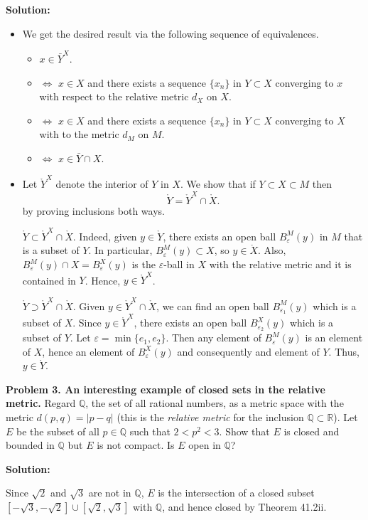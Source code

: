 \documentclass[12pt]{article}
\def\black{\color{black}}
\def\green{\color{rltgreen}}
\newcommand\bi{\begin{itemize}}
\newcommand\ei{\end{itemize}}
\newcommand\itema{\item[(a)]}
\newcommand\itemb{\item[(b)]}
\renewcommand\|{\ | \ }
\newcommand\Q{\mathbb{Q}}
\newcommand\R{\mathbb{R}}
\def\pb#1{{\green \bf Problem #1.}\hskip 8pt \black}
\def\sol{\textbf{Solution:}}
\def\sequence#1{$\{{#1}_n\}$}
\newcommand\e\varepsilon
\begin{document}
\sol

\bi
\itema
We get the desired result via the following sequence of equivalences. 
\bi
\item[]
$x \in \bar Y^X$.
\item[$\Leftrightarrow$]
$x \in X$ and there exists a sequence \sequence x in $Y \subset X$
converging to $x$
with respect to the relative metric $d_X$ on $X$.
\item[$\Leftrightarrow$]
$x \in X$ and there exists a sequence \sequence x in $Y \subset X$
converging to $X$ with to the metric $d_M$ on $M$.
\item[$\Leftrightarrow$]
$x \in \bar Y \cap X$.
\ei

\itemb
Let $\mathring Y^X$ denote the interior of $Y$ in $X$. We show that
if $Y \subset X \subset M$ then
\[
\mathring Y = \mathring Y^X \cap \mathring X.
\]
by proving inclusions both ways.

$\mathring Y \subset \mathring Y^X \cap \mathring X$. Indeed, given 
$y \in \mathring Y$, there exists an open ball $B^M_{\e}(y)$ in $M$ that
is a subset of $Y$. In particular, $B^M_{\e}(y) \subset X$, so 
$y \in \mathring X$. Also, $B^M_{\e}(y) \cap X = B^X_{\e}(y)
$ is the $\e$-ball in $X$
with the relative metric and it is contained in $Y$. Hence, 
$y \in \mathring Y^X$.

$\mathring Y \supset \mathring Y^X \cap \mathring X$. Given 
$y \in  \mathring Y^X \cap \mathring X$, we can find an open ball
$B_{\e_1}^M(y)$ which is a subset of $X$. Since $y \in \mathring Y^X$, 
there exists an open ball $B_{\e_2}^X(y)$ which is a subset of $Y$.
Let $\e = \min\{e_1, e_2\}$. Then any element of $B_{\e}^M(y)$ is an
element of $X$, hence an element of $B_{\e}^X(y)$ and consequently
and element of $Y$. Thus, $y \in \mathring Y$.
\ei


\pb{3. An interesting example of closed sets in the relative metric}
Regard $\Q$, the set of all rational numbers, as a metric space with the
metric $d(p, q) = |p - q|$ (this is the \emph{relative metric} for the
inclusion $\Q \subset \R$). Let $E$ be the subset of all $p \in \Q$ such that
$2 < p^2 < 3$. Show that $E$ is closed and bounded in $\Q$ but $E$ is not
compact. Is $E$ open in $\Q$?

\sol

Since $\sqrt 2$ and $\sqrt 3$ are not in $\Q$, $E$ is the intersection of a
closed subset $[-\sqrt 3, -\sqrt 2] \cup [\sqrt 2, \sqrt 3]$ with $\Q$, 
and hence closed by Theorem 41.2ii.
\end{document}
